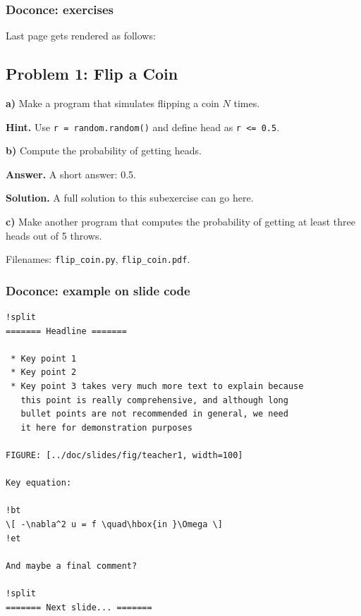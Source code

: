 \documentclass{beamer}
\newenvironment{exercise}{}{}
\newcounter{exerno}
\begin{document}
\begin{frame}
\frametitle{Doconce: exercises}

Last page gets rendered as follows:



\begin{exercise}

\subsection*{Problem 1: Flip a Coin}
\label{demo:ex:1}


\noindent\textbf{a)}
Make a program that simulates flipping a coin $N$ times.


\noindent\textbf{Hint.}
Use \Verb!r = random.random()! and define head as \Verb!r <= 0.5!.

\noindent\textbf{b)}
Compute the probability of getting heads.


\noindent\textbf{Answer.}
A short answer: 0.5.


\noindent\textbf{Solution.}
A full solution to this subexercise can go here.

\noindent\textbf{c)}
Make another program that computes the probability
of getting at least three heads out of 5 throws.

Filenames: \Verb!flip_coin.py!, \Verb!flip_coin.pdf!.

\end{exercise}
\end{frame}

\begin{frame}
\frametitle{Doconce: example on slide code}

\begin{Verbatim}[numbers=none,fontsize=\fontsize{9pt}{9pt},baselinestretch=0.95]
!split
======= Headline =======

 * Key point 1
 * Key point 2
 * Key point 3 takes very much more text to explain because
   this point is really comprehensive, and although long
   bullet points are not recommended in general, we need
   it here for demonstration purposes

FIGURE: [../doc/slides/fig/teacher1, width=100]

Key equation:

!bt
\[ -\nabla^2 u = f \quad\hbox{in }\Omega \]
!et

And maybe a final comment?

!split
======= Next slide... =======
\end{Verbatim}
\end{frame}
\end{document}
